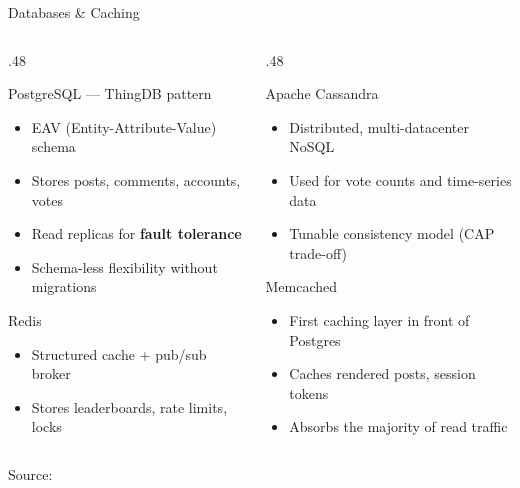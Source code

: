 \documentclass[
  aspectratio=169,
]{beamer}
\begin{document}
\begin{frame}{Databases \& Caching}
  \begin{columns}[T]
    \begin{column}{.48\textwidth}
      \begin{block}{PostgreSQL — ThingDB pattern}
        \begin{itemize}
          \item EAV (Entity-Attribute-Value) schema
          \item Stores posts, comments, accounts, votes
          \item Read replicas for \textbf{fault tolerance}
          \item Schema-less flexibility without migrations
        \end{itemize}
      \end{block}
      \vspace{2mm}
      \begin{block}{Redis}
      	\begin{itemize}
      		\item Structured cache + pub/sub broker
      		\item Stores leaderboards, rate limits, locks
      	\end{itemize}
      \end{block}
      
    \end{column}
    \begin{column}{.48\textwidth}
      \begin{block}{Apache Cassandra}
      	\begin{itemize}
      		\item Distributed, multi-datacenter NoSQL
      		\item Used for vote counts and time-series data
      		\item \alert{Tunable consistency} model (CAP trade-off)
      	\end{itemize}
      \end{block}
      \vspace{2mm}
      \begin{block}{Memcached}
      	\begin{itemize}
      		\item First caching layer in front of Postgres
      		\item Caches rendered posts, session tokens
      		\item Absorbs the majority of read traffic
      	\end{itemize}
      \end{block}
    \end{column}
  \end{columns}
  \vspace{1mm}
  {\footnotesize Source: \cite{bytebytego2024reddit}}
\end{frame}
\end{document}
